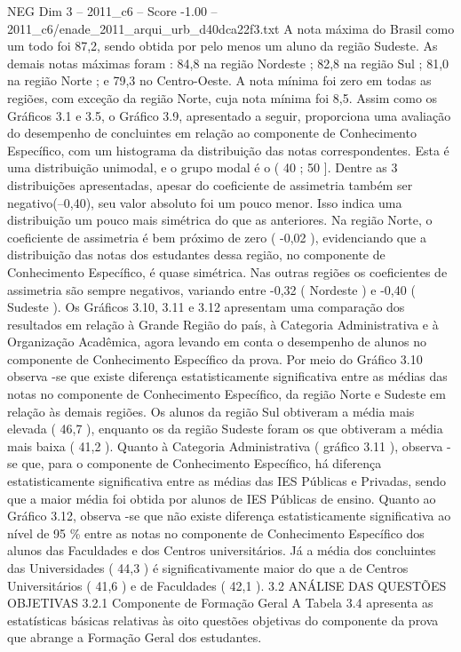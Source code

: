 \begin{textsample}{NEG Dim 3 – 2011\_c6 – Score -1.00 – 2011\_c6/enade\_2011\_arqui\_urb\_d40dca22f3.txt}
A nota máxima do Brasil como um todo foi 87,2, sendo obtida por pelo menos um aluno da região Sudeste.
As demais notas máximas foram : 84,8 na região Nordeste ; 82,8 na região Sul ; 81,0 na região Norte ; e 79,3 no Centro-Oeste.
A nota mínima foi zero em todas as regiões, com exceção da região Norte, cuja nota mínima foi 8,5.
Assim como os Gráficos 3.1 e 3.5, o Gráfico 3.9, apresentado a seguir, proporciona uma avaliação do desempenho de concluintes em relação ao componente de Conhecimento Específico, com um histograma da distribuição das notas correspondentes.
Esta é uma distribuição unimodal, e o grupo modal é o ( 40 ; 50 ].
Dentre as 3 distribuições apresentadas, apesar do coeficiente de assimetria também ser negativo(–0,40), seu valor absoluto foi um pouco menor.
Isso indica uma distribuição um pouco mais simétrica do que as anteriores.
Na região Norte, o coeficiente de assimetria é bem próximo de zero ( -0,02 ), evidenciando que a distribuição das notas dos estudantes dessa região, no componente de Conhecimento Específico, é quase simétrica.
Nas outras regiões os coeficientes de assimetria são sempre negativos, variando entre -0,32 ( Nordeste ) e -0,40 ( Sudeste ).
Os Gráficos 3.10, 3.11 e 3.12 apresentam uma comparação dos resultados em relação à Grande Região do país, à Categoria Administrativa e à Organização Acadêmica, agora levando em conta o desempenho de alunos no componente de Conhecimento Específico da prova.
Por meio do Gráfico 3.10 observa -se que existe diferença estatisticamente significativa entre as médias das notas no componente de Conhecimento Específico, da região Norte e Sudeste em relação às demais regiões.
Os alunos da região Sul obtiveram a média mais elevada ( 46,7 ), enquanto os da região Sudeste foram os que obtiveram a média mais baixa ( 41,2 ).
Quanto à Categoria Administrativa ( gráfico 3.11 ), observa -se que, para o componente de Conhecimento Específico, há diferença estatisticamente significativa entre as médias das IES Públicas e Privadas, sendo que a maior média foi obtida por alunos de IES Públicas de ensino.
Quanto ao Gráfico 3.12, observa -se que não existe diferença estatisticamente significativa ao nível de 95 \% entre as notas no componente de Conhecimento Específico dos alunos das Faculdades e dos Centros universitários.
Já a média dos concluintes das Universidades ( 44,3 ) é significativamente maior do que a de Centros Universitários ( 41,6 ) e de Faculdades ( 42,1 ). 3.2 ANÁLISE DAS QUESTÕES OBJETIVAS 3.2.1 Componente de Formação Geral A Tabela 3.4 apresenta as estatísticas básicas relativas às oito questões objetivas do componente da prova que abrange a Formação Geral dos estudantes.

\end{textsample}
